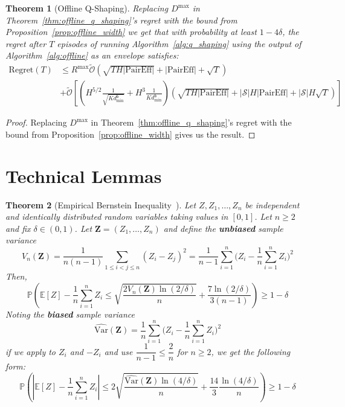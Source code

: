 \documentclass[twoside]{article}
\newtheorem{theorem}{Theorem}
\begin{document}
\begin{theorem}[Offline Q-Shaping]
      Replacing $D^{\max}$ in Theorem~\ref{thm:offline_q_shaping}'s regret with the bound from Proposition~\ref{prop:offline_width} we get that with probability at least $1-4\delta$, the regret after $T$ episodes of running Algorithm~\ref{alg:q_shaping} using the output of Algorithm~\ref{alg:offline} as an envelope satisfies:
\begin{align*}
    \mathrm{Regret}(T) & \leq 
R^{\max}\tilde{\mathcal O}\left( \sqrt{TH|\mathrm{PairEff}|} + |\mathrm{PairEff}| + \sqrt{T} \right)\\
&+ \tilde{\mathcal O}\left[ \left( H^{5/2}\frac{1}{\sqrt{K d_{\min}^{\mathsf b}}} + H^{3}\frac{1}{K d_{\min}^{\mathsf b}} \right)\left( \sqrt{TH|\mathrm{PairEff}|} + |\mathcal{S}|H|\mathrm{PairEff}| + |\mathcal{S}|H\sqrt{T} \right) \right]
\end{align*}
\end{theorem}
\begin{proof}
     Replacing $D^{\max}$ in Theorem~\ref{thm:offline_q_shaping}'s regret with the bound from Proposition~\ref{prop:offline_width} gives us the result.
\end{proof}

\section{Technical Lemmas}

\begin{theorem}[Empirical Bernstein Inequality~\cite{maurer_empirical_2009}]
\label{thm:empirical_bernstein}
Let $Z,Z_{1},\dots,Z_{n}$ be independent and identically distributed random variables
taking values in $[0,1]$. Let $n\ge 2$ and fix $\delta\in(0,1)$. Let
$\mathbf{Z}=(Z_{1},\dots,Z_{n})$ and define the \textbf{unbiased} sample variance
\[
V_{n}(\mathbf{Z})
 = 
\frac{1}{n(n-1)}\sum_{1\le i<j\le n}(Z_{i}-Z_{j})^{2}
= 
\frac{1}{n-1}\sum_{i=1}^n\Big(Z_i -  \frac{1}{n}\sum_{i=1}^{n} Z_{i}\Big)^2
\]
Then, 
\[
\mathbb{P}\left( \mathbb{E}[Z]  -  \frac{1}{n}\sum_{i=1}^{n} Z_{i}
 \le 
\sqrt{\frac{2 V_{n}(\mathbf{Z}) \ln(2/\delta)}{n}}
 + 
\frac{7 \ln(2/\delta)}{3 (n-1)} \right ) \ge 1 - \delta
\]
Noting the \textbf{biased} sample variance
\[\widehat{\mathrm{Var}}(\mathbf{Z})
 = 
\frac{1}{n}\sum_{i=1}^n\Big(Z_i -  \frac{1}{n}\sum_{i=1}^{n} Z_{i}\Big)^2
\]
if we apply to $Z_i$ and $-Z_i$ and use \( \dfrac{1}{n-1} \leq \dfrac{2}{n} \) for \( n \geq 2\), we get the following form:
\[
\mathbb{P}\left( \left | \mathbb{E}[Z]  -  \frac{1}{n}\sum_{i=1}^{n} Z_{i} \right |
 \le 
2\sqrt{\frac{ \widehat{\mathrm{Var}}(\mathbf{Z}) \ln(4/\delta)}{n}}
 + 
\frac{14}{3}\frac{\ln(4/\delta)}{n} \right ) \ge 1 - \delta
\]
\end{theorem}
\end{document}
